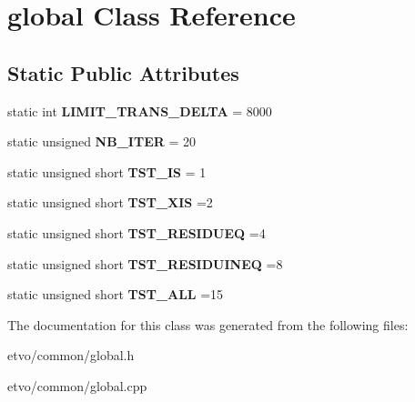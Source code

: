 \hypertarget{classglobal}{}\section{global Class Reference}
\label{classglobal}
\subsection*{Static Public Attributes}
\begin{DoxyCompactItemize}
\item 
\mbox{\label{classglobal_a9fe6aeb44df54c3e343f6239074246b3}} 
static int {\bfseries L\+I\+M\+I\+T\+\_\+\+T\+R\+A\+N\+S\+\_\+\+D\+E\+L\+TA} = 8000
\item 
\mbox{\label{classglobal_acc4aeb51e1ad5462dab6fce5ed4ce10f}} 
static unsigned {\bfseries N\+B\+\_\+\+I\+T\+ER} = 20
\item 
\mbox{\label{classglobal_a7a1821e456f0e2b0441f661e149d20bb}} 
static unsigned short {\bfseries T\+S\+T\+\_\+\+IS} = 1
\item 
\mbox{\label{classglobal_a2c3c7e7100a3264b784b563be18bfcd6}} 
static unsigned short {\bfseries T\+S\+T\+\_\+\+X\+IS} =2
\item 
\mbox{\label{classglobal_ad10a0831b9a97a1607624aaed470b374}} 
static unsigned short {\bfseries T\+S\+T\+\_\+\+R\+E\+S\+I\+D\+U\+EQ} =4
\item 
\mbox{\label{classglobal_a98f30b2015e6cdeff6f3dbd4f46e137d}} 
static unsigned short {\bfseries T\+S\+T\+\_\+\+R\+E\+S\+I\+D\+U\+I\+N\+EQ} =8
\item 
\mbox{\label{classglobal_ab374d58133c28098e19c7ba7036deffa}} 
static unsigned short {\bfseries T\+S\+T\+\_\+\+A\+LL} =15
\end{DoxyCompactItemize}


The documentation for this class was generated from the following files\+:\begin{DoxyCompactItemize}
\item 
etvo/common/global.\+h\item 
etvo/common/global.\+cpp\end{DoxyCompactItemize}
